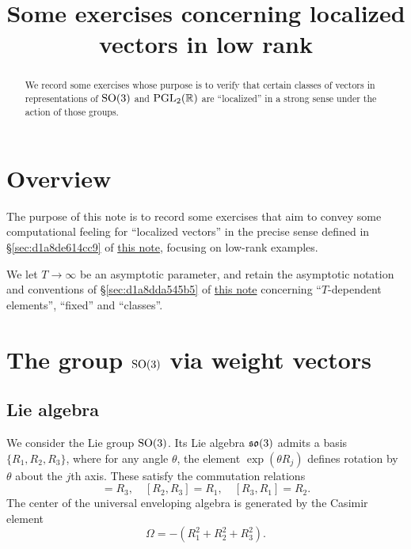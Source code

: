 \documentclass[reqno]{amsart} 
\title{Some exercises concerning localized vectors in low rank}
\numberwithin{equation}{section}
\numberwithin{theorem}{section}
\begin{document}
\maketitle
\tableofcontents

\begin{abstract}
We record some exercises whose purpose is to verify that certain classes of vectors in representations of $\operatorname{SO}(3)$ and $\operatorname{PGL}_2(\mathbb{R})$ are ``localized'' in a strong sense under the action of those groups.  
\end{abstract}

\section{Overview}\label{sec:d1a9162ede03}

The purpose of this note is to record some exercises that aim to convey some computational feeling for ``localized vectors'' in the precise sense defined in \S\ref{sec:d1a8de614cc9} of \href{20230522T150333__microlocal-localized-vectors.pdf}{this note}, focusing on low-rank examples.

We let $T \rightarrow \infty$ be an asymptotic parameter, and retain the asymptotic notation and conventions of \S\ref{sec:d1a8dda545b5} of \href{20230522T150333__microlocal-localized-vectors.pdf}{this note} concerning ``$T$-dependent elements'', ``fixed'' and ``classes''.

\section{The group $\operatorname{SO}(3)$ via weight vectors}\label{sec:d1a9162ed4bc}

\subsection{Lie algebra}\label{sec:d1a9162ece67}
We consider the Lie group $\operatorname{SO}(3)$.  Its Lie algebra $\operatorname{\mathfrak{s}\mathfrak{o}}(3)$ admits a basis $\{R_1, R_2, R_3\}$, where for any angle $\theta$, the element $\exp(\theta R_j)$ defines rotation by $\theta$ about the $j$th axis.  These satisfy the commutation relations
\begin{equation*} [R_1,R_2] = R_3, \quad [R_2,R_3] = R_1, \quad [R_3,R_1] = R_2.
\end{equation*}
The center of the universal enveloping algebra is generated by the Casimir element
\begin{equation*}
  \Omega = -(R_1^2 + R_2^2 + R_3^2).
\end{equation*}
\end{document}
